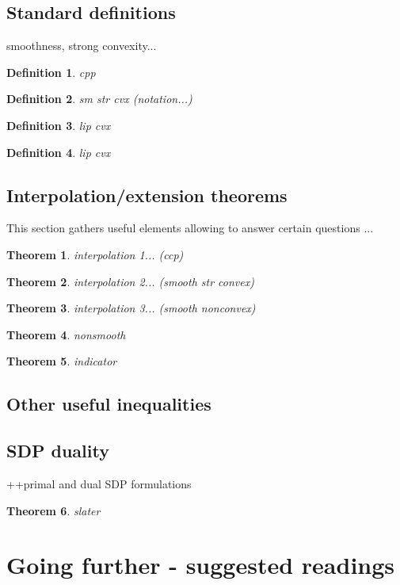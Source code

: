 \documentclass[11pt,a4paper]{article}
\newtheorem{theorem}{Theorem}
\newtheorem{definition}{Definition}
\begin{document}
	\subsection{Standard definitions}
	smoothness, strong convexity...
	\begin{definition}\label{def:ccp}
	cpp
	\end{definition}
	\begin{definition}\label{def:smoothstronglyconvex}
	sm str cvx (notation...)
	\end{definition}
	\begin{definition}\label{def:Lipschitzcvx}
	lip cvx
	\end{definition}
	\begin{definition}\label{def:Lipschitzcvx}
	lip cvx
	\end{definition}
	
	\subsection{Interpolation/extension theorems}
	This section gathers useful elements allowing to answer certain questions ...
	\begin{theorem}
	interpolation 1... (ccp)
	\end{theorem}
	\begin{theorem}\label{thm:interp_smoothstronglyconvex}
	interpolation 2... (smooth str convex)
	\end{theorem}
	\begin{theorem}
	interpolation 3... (smooth nonconvex)
	\end{theorem}
	\begin{theorem}
	nonsmooth
	\end{theorem}
	\begin{theorem}
	indicator
	\end{theorem}
	\subsection{Other useful inequalities}
	\subsection{SDP duality}
	++primal and dual SDP formulations
	\begin{theorem}
	slater
	\end{theorem}
	\section{Going further - suggested readings}\label{s:readings}
\end{document}
